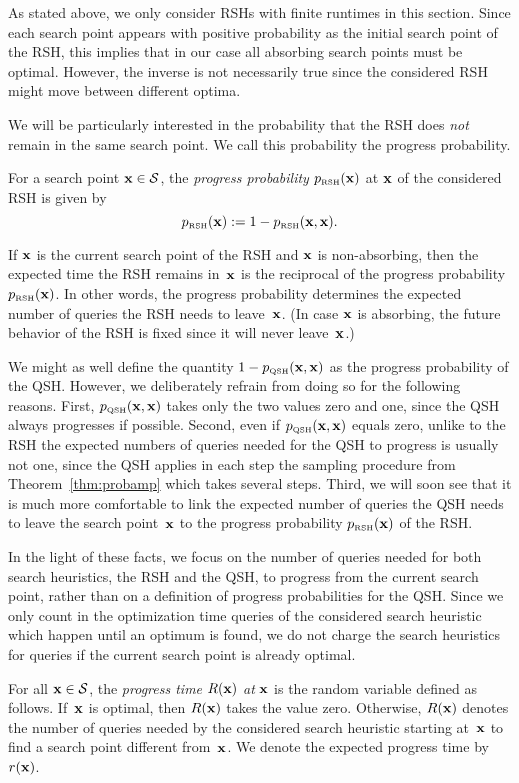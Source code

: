 \documentclass[a4paper,11pt]{article}
\begin{document}
As stated above, we only consider RSHs with finite runtimes in this section. Since each search point appears with positive probability as the initial search point of the RSH, this implies that in our case all absorbing search points must be optimal. However, the inverse is not necessarily true since the considered RSH might move between different optima.

We will be particularly interested in the probability that the RSH does \emph{not} remain in the same search point. We call this probability the progress probability.
\begin{definition}
For a search point $\xvec\in\mathcal{S}$, the \emph{progress probability} $p_\RSH(\xvec)$ at $\xvec$ of the considered RSH is given by
\[
p_\RSH(\xvec):=1-p_\RSH(\xvec,\xvec).
\]
\end{definition}
If $\xvec$ is the current search point of the RSH and $\xvec$ is non-absorbing, then the expected time the RSH remains in~$\xvec$ is the reciprocal of the progress probability $p_\RSH(\xvec)$. In other words, the progress probability determines the expected number of queries the RSH needs to leave~$\xvec$. (In case $\xvec$ is absorbing, the future behavior of the RSH is fixed since it will never leave~$\xvec$.) 

We might as well define the quantity $1-p_\QSH(\xvec,\xvec)$ as the progress probability of the QSH. However, we deliberately refrain from doing so for the following reasons. First, $p_\QSH(\xvec,\xvec)$ takes only the two values zero and one, since the QSH always progresses if possible. Second, even if $p_\QSH(\xvec,\xvec)$ equals zero, unlike to the RSH the expected numbers of queries needed for the QSH to progress is usually not one, since the QSH applies in each step the sampling procedure from Theorem~\ref{thm:probamp} which takes several steps. Third, we will soon see that it is much more comfortable to link the expected number of queries the QSH needs to leave the search point~$\xvec$ to the progress probability $p_\RSH(\xvec)$ of the RSH. 

In the light of these facts, we focus on the number of queries needed for both search heuristics, the RSH and the QSH, to progress from the current search point, rather than on a definition of progress probabilities for the QSH. Since we only count in the optimization time queries of the considered search heuristic which happen until an optimum is found, we do not charge the search heuristics for queries if the current search point is already optimal.
\begin{definition}
\label{def:cost}
For all $\xvec\in\mathcal{S}$, the \emph{progress time} $R(\xvec)$ \emph{at} $\xvec$ is the random variable defined as follows. If~$\xvec$ is optimal, then $R(\xvec)$ takes the value zero. Otherwise, $R(\xvec)$ denotes the number of queries needed by the considered search heuristic starting at~$\xvec$ to find a search point different from~$\xvec$. We denote the expected progress time by~$r(\xvec)$.
\end{definition}
\end{document}
